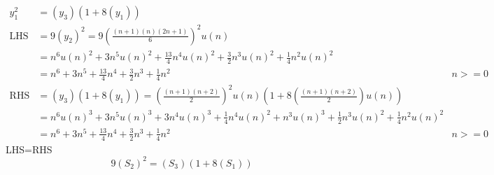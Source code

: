 \documentclass[journal,12pt,onecolumn]{IEEEtran}
\theoremstyle{remark}
\begin{document}
\begin{align}
y_1^2 &= (y_3)(1 + 8(y_1)) \\
\text{LHS} &= 9(y_2)^2 = 9\left(\frac{(n+1)(n)(2n+1)}{6}\right)^2u(n)\\
&=n^6 u(n)^2 + 3n^5 u(n)^2 + \frac{13}{4}n^4 u(n)^2 + \frac{3}{2}n^3 u(n)^2 + \frac{1}{4}n^2 u(n)^2\\
&= n^6 + 3n^5 + \frac{13}{4}n^4 + \frac{3}{2}n^3 + \frac{1}{4}n^2 &n>=0\\
\text{RHS} &= (y_3)(1 + 8(y_1)) = \left(\frac{(n+1)(n+2)}{2}\right)^2u(n)(1+8\left(\frac{(n+1)(n+2)}{2}\right)u(n)) \\
&=n^6 u(n)^3 + 3n^5 u(n)^3 + 3n^4 u(n)^3 + \frac{1}{4}n^4 u(n)^2 + n^3 u(n)^3 + \frac{1}{2}n^3 u(n)^2 + \frac{1}{4}n^2 u(n)^2\\
&= n^6 + 3n^5 + \frac{13}{4}n^4 + \frac{3}{2}n^3 + \frac{1}{4}n^2 &n>=0
\end{align}
LHS=RHS
\[ 9(S_2)^2 = (S_3)(1 + 8(S_1)) \]    
\end{document}
